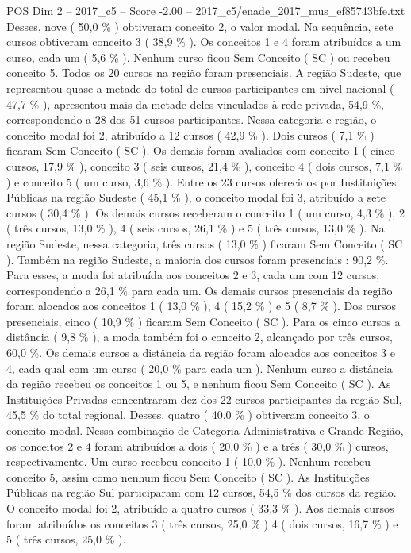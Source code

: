 \begin{textsample}{POS Dim 2 – 2017\_c5 – Score -2.00 – 2017\_c5/enade\_2017\_mus\_ef85743bfe.txt}
Desses, nove ( 50,0 \% ) obtiveram conceito 2, o valor modal.
Na sequência, sete cursos obtiveram conceito 3 ( 38,9 \% ).
Os conceitos 1 e 4 foram atribuídos a um curso, cada um ( 5,6 \% ).
Nenhum curso ficou Sem Conceito ( SC ) ou recebeu conceito 5.
Todos os 20 cursos na região foram presenciais.
A região Sudeste, que representou quase a metade do total de cursos participantes em nível nacional ( 47,7 \% ), apresentou mais da metade deles vinculados à rede privada, 54,9 \%, correspondendo a 28 dos 51 cursos participantes.
Nessa categoria e região, o conceito modal foi 2, atribuído a 12 cursos ( 42,9 \% ).
Dois cursos ( 7,1 \% ) ficaram Sem Conceito ( SC ).
Os demais foram avaliados com conceito 1 ( cinco cursos, 17,9 \% ), conceito 3 ( seis cursos, 21,4 \% ), conceito 4 ( dois cursos, 7,1 \% ) e conceito 5 ( um curso, 3,6 \% ).
Entre os 23 cursos oferecidos por Instituições Públicas na região Sudeste ( 45,1 \% ), o conceito modal foi 3, atribuído a sete cursos ( 30,4 \% ).
Os demais cursos receberam o conceito 1 ( um curso, 4,3 \% ), 2 ( três cursos, 13,0 \% ), 4 ( seis cursos, 26,1 \% ) e 5 ( três cursos, 13,0 \% ).
Na região Sudeste, nessa categoria, três cursos ( 13,0 \% ) ficaram Sem Conceito ( SC ).
Também na região Sudeste, a maioria dos cursos foram presenciais : 90,2 \%.
Para esses, a moda foi atribuída aos conceitos 2 e 3, cada um com 12 cursos, correspondendo a 26,1 \% para cada um.
Os demais cursos presenciais da região foram alocados aos conceitos 1 ( 13,0 \% ), 4 ( 15,2 \% ) e 5 ( 8,7 \% ).
Dos cursos presenciais, cinco ( 10,9 \% ) ficaram Sem Conceito ( SC ).
Para os cinco cursos a distância ( 9,8 \% ), a moda também foi o conceito 2, alcançado por três cursos, 60,0 \%.
Os demais cursos a distância da região foram alocados aos conceitos 3 e 4, cada qual com um curso ( 20,0 \% para cada um ).
Nenhum curso a distância da região recebeu os conceitos 1 ou 5, e nenhum ficou Sem Conceito ( SC ).
As Instituições Privadas concentraram dez dos 22 cursos participantes da região Sul, 45,5 \% do total regional.
Desses, quatro ( 40,0 \% ) obtiveram conceito 3, o conceito modal.
Nessa combinação de Categoria Administrativa e Grande Região, os conceitos 2 e 4 foram atribuídos a dois ( 20,0 \% ) e a três ( 30,0 \% ) cursos, respectivamente.
Um curso recebeu conceito 1 ( 10,0 \% ).
Nenhum recebeu conceito 5, assim como nenhum ficou Sem Conceito ( SC ).
As Instituições Públicas na região Sul participaram com 12 cursos, 54,5 \% dos cursos da região.
O conceito modal foi 2, atribuído a quatro cursos ( 33,3 \% ).
Aos demais cursos foram atribuídos os conceitos 3 ( três cursos, 25,0 \% ) 4 ( dois cursos, 16,7 \% ) e 5 ( três cursos, 25,0 \% ).

\end{textsample}
